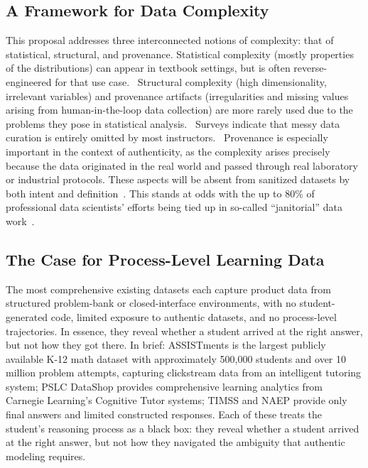 \documentclass[11pt]{article}
\begin{document}
\subsection{A Framework for Data Complexity}
This proposal addresses three interconnected notions of complexity: that of statistical, structural, and provenance.
Statistical complexity (mostly properties of the distributions) can appear in textbook settings, but is often reverse-engineered for that use case.~\cite{kerlin2010complexity, kjelvik2019getting}
Structural complexity (high dimensionality, irrelevant variables) and provenance artifacts (irregularities and missing values arising from human-in-the-loop data collection) are more rarely used due to the problems they pose in statistical analysis.~\cite{berland2010learning, gould2014praise}
Surveys indicate that messy data curation is entirely omitted by most instructors.~\cite{legacy2022computes, konold2000engaging}
Provenance is especially important in the context of authenticity, as the complexity arises precisely because the data originated in the real world and passed through real laboratory or industrial protocols.
These aspects will be absent from sanitized datasets by both intent and definition~\cite{hardin2018dynamic}.
This stands at odds with the up to 80\% of professional data scientists' efforts being tied up in so-called ``janitorial'' data work~\cite{donoho201750, lohr2014big}. 

\subsection{The Case for Process-Level Learning Data}

The most comprehensive existing datasets each capture product data from structured problem-bank or closed-interface environments, with no student-generated code, limited exposure to authentic datasets, and no process-level trajectories. In essence, they reveal whether a student arrived at the right answer, but not how they got there. In brief: ASSISTments \cite{feng2009addressing} is the largest publicly available K-12 math dataset with approximately 500,000 students and over 10 million problem attempts, capturing clickstream data from an intelligent tutoring system; PSLC DataShop \cite{koedinger2010data} provides comprehensive learning analytics from Carnegie Learning's Cognitive Tutor systems; TIMSS \cite{mullis2012timss} and NAEP \cite{nces2012naep, nces2012naep_science} provide only final answers and limited constructed responses. Each of these treats the student's reasoning process as a black box: they reveal whether a student arrived at the right answer, but not how they navigated the ambiguity that authentic modeling requires.
\end{document}
